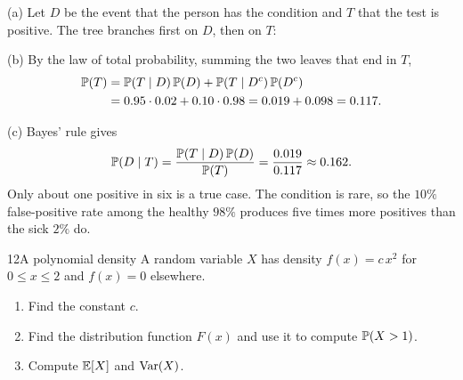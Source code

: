 \begin{solution}
(a) Let $D$ be the event that the person has the condition and $T$ that the
test is positive. The tree branches first on $D$, then on $T$:

\begin{center}
\end{center}

(b) By the law of total probability, summing the two leaves that end in $T$,
\begin{align*}
  \mathbb{P}(T) &= \mathbb{P}(T\mid D)\,\mathbb{P}(D) + \mathbb{P}(T\mid D^c)\,\mathbb{P}(D^c) \\
           &= 0.95\cdot0.02 + 0.10\cdot0.98 = 0.019 + 0.098 = 0.117.
\end{align*}

(c) Bayes' rule gives
\begin{equation*}
  \mathbb{P}(D\mid T) = \frac{\mathbb{P}(T\mid D)\,\mathbb{P}(D)}{\mathbb{P}(T)}
                 = \frac{0.019}{0.117} \approx 0.162.
\end{equation*}
Only about one positive in six is a true case. The condition is rare, so the
$10\%$ false-positive rate among the healthy $98\%$ produces five times more
positives than the sick $2\%$ do.
\end{solution}

\begin{problem}{12}{A polynomial density}
A random variable $X$ has density $f(x) = c\,x^2$ for $0 \le x \le 2$ and
$f(x)=0$ elsewhere.
\begin{enumerate}
  \item Find the constant $c$.
  \item Find the distribution function $F(x)$ and use it to compute
        $\mathbb{P}(X > 1)$.
  \item Compute $\mathbb{E}[X]$ and $\operatorname{Var}(X)$.
\end{enumerate}
\end{problem}

